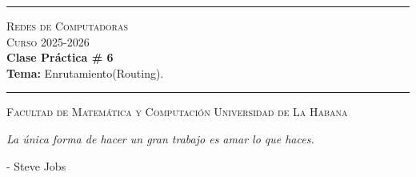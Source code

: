 \documentclass[12pt]{amsart}
\begin{document}
	\hrule
	\smallskip
	\begin{center}
		{\scshape {\large Redes de Computadoras} \\
			Curso 2025-2026} \\ \smallskip
		\textbf{Clase Práctica \# 6} \\
		{\small \textbf{Tema:} Enrutamiento(Routing).}
	\end{center}
	\vspace{-8px}
	\rule{\linewidth}{2pt}
	
	{\scshape Facultad de Matemática y Computación}  \hfill {\scshape Universidad de La Habana}
	
	\bigskip\bigskip
	
	
	
	\vspace{1cm}
	
	\begin{center}
		\textit{La única forma de hacer un gran trabajo es amar lo que haces.}
	\end{center}
	
	\begin{flushright}
		- Steve Jobs
	\end{flushright}
	
	\vspace{1cm}
	
\end{document}

